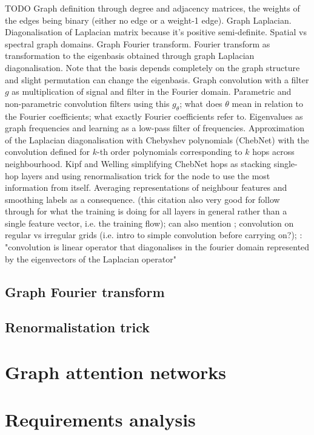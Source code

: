 TODO Graph definition through degree and adjacency matrices, the weights of the edges being binary (either no edge or a weight-1 edge). Graph Laplacian. Diagonalisation of Laplacian matrix because it's positive semi-definite. Spatial vs spectral graph domains. Graph Fourier transform. Fourier transform as transformation to the eigenbasis obtained through graph Laplacian diagonalisation. Note that the basis depends completely on the graph structure and slight permutation can change the eigenbasis. Graph convolution with a filter $g$ as multiplication of signal and filter in the Fourier domain. Parametric and non-parametric convolution filters using this $g_\theta$; what does $\theta$ mean in relation to the Fourier coefficients; what exactly Fourier coefficients refer to. Eigenvalues as graph frequencies and learning as a low-pass filter of frequencies. Approximation of the Laplacian diagonalisation with Chebyshev polynomials (ChebNet) with the convolution defined for $k$-th order polynomials corresponding to $k$ hops across neighbourhood. \cite{defferrard2016convolutional} Kipf and Welling simplifying ChebNet hops as stacking single-hop layers and using renormalisation trick for the node to use the most information from itself. \cite{kipf2017semi} Averaging representations of neighbour features and smoothing labels as a consequence. \cite{wu2019simplifying} (this citation also very good for follow through for what the training is doing for all layers in general rather than a single feature vector, i.e. the training flow); can also mention \cite{wu2019comprehensive}; convolution on regular vs irregular grids (i.e. intro to simple convolution before carrying on?); \cite{defferrard2016convolutional}: "convolution is linear operator that diagonalises in the fourier domain represented by the eigenvectors of the Laplacian operator"

\subsection{Graph Fourier transform}

\subsection{Renormalistation trick}
\section{Graph attention networks}

\section{Requirements analysis}

